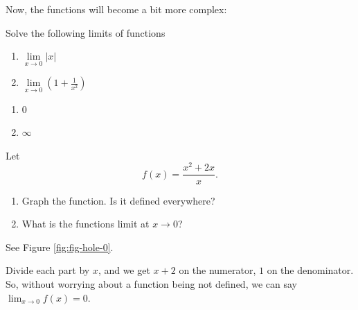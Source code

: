 \documentclass[
]{article}
\begin{document}
Now, the functions will become a bit more complex:

\begin{exercise}
\protect\hypertarget{exr:discontlim}{}\label{exr:discontlim}

Solve the following limits of functions

\begin{enumerate}
\def\labelenumi{\arabic{enumi}.}
\tightlist
\item
  \(\lim\limits_{x\to 0} |x|\)
\item
  \(\lim\limits_{x\to 0} \left(1+\frac{1}{x^2}\right)\)
\end{enumerate}

\end{exercise}

\begin{solution}
\hfill
\begin{enumerate}
\item $0$
\item $\infty$
\end{enumerate}
\end{solution}

\begin{exercise}
\protect\hypertarget{exr:discontdraw}{}\label{exr:discontdraw}

Let \[f(x) = \frac{x^2 + 2x}{x}.\]

\begin{enumerate}
\def\labelenumi{\arabic{enumi}.}
\tightlist
\item
  Graph the function. Is it defined everywhere?
\item
  What is the functions limit at \(x \rightarrow 0\)?
\end{enumerate}

\end{exercise}


\begin{solution}
See Figure \ref{fig:fig-hole-0}.

Divide each part by \(x\), and we get \(x + 2\) on the numerator, \(1\) on the denominator. So, without worrying about a function being not defined, we can say \(\lim_{x\to 0}f(x) = 0\).
\end{solution}
\end{document}
